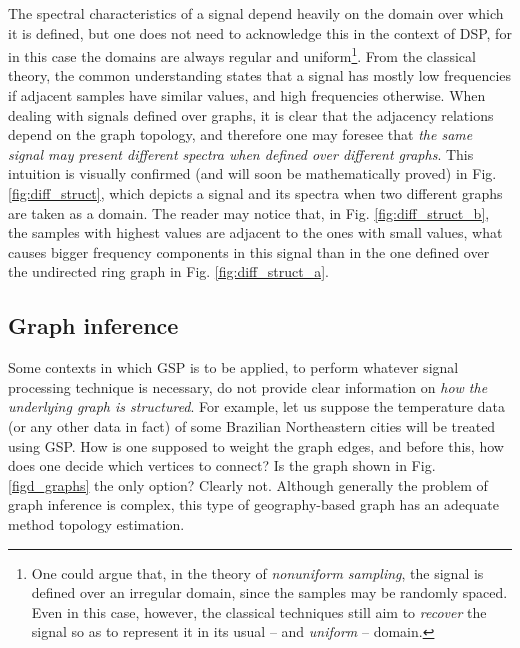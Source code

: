 The spectral characteristics of a signal depend heavily on the domain over which it is defined, but one does not need to acknowledge this in the context of DSP, for in this case the domains are always regular and uniform\footnote{One could argue that, in the theory of \emph{nonuniform sampling}, the signal is defined over an irregular domain, since the samples may be randomly spaced. Even in this case, however, the classical techniques still aim to \emph{recover} the signal so as to represent it in its usual -- and \emph{uniform} -- domain.
}.
From the classical theory, the common understanding states that a signal has mostly low frequencies if adjacent samples have similar values, and high frequencies otherwise. When dealing with signals defined over graphs, it is clear that the adjacency relations depend on the graph topology, and therefore one may foresee that \emph{the same signal may present different spectra when defined over different graphs}. This intuition is visually confirmed (and will soon be mathematically proved) in Fig. \ref{fig:diff_struct}, which depicts a signal and its spectra when two different graphs are taken as a domain. The reader may notice that, in Fig. \ref{fig:diff_struct_b}, the samples with highest values are adjacent to the ones with small values, what causes bigger frequency components in this signal than in the one defined over the undirected ring graph in Fig. \ref{fig:diff_struct_a}.

\subsection{Graph inference}
\label{subsec:inferindo}

Some contexts in which GSP is to be applied, to perform whatever signal processing technique is necessary, do not provide clear information on \emph{how the underlying graph is structured}. For example, let us suppose the temperature data (or any other data in fact) of some Brazilian Northeastern cities will be treated using GSP. How is one supposed to weight the graph edges, and before this, how does one decide which vertices to connect? Is the graph shown in Fig. \ref{figd_graphs} the only option? Clearly not. Although generally the problem of graph inference is complex, this type of geography-based graph has an adequate method topology estimation.

